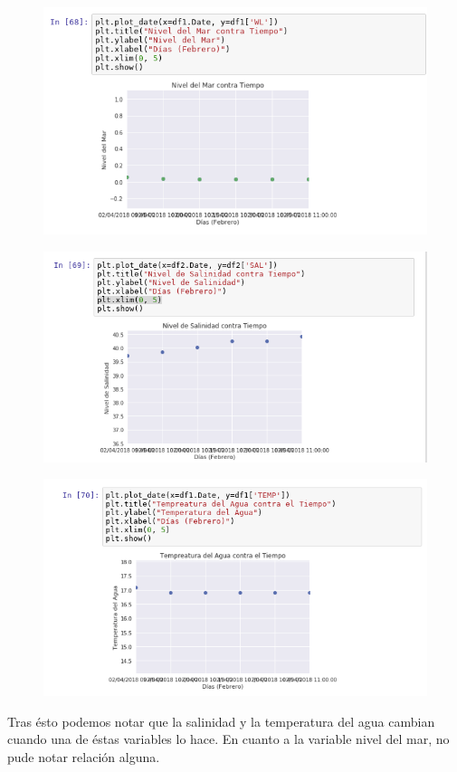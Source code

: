 \documentclass{article}
\begin{document}
\begin{figure}[H]
	\centering
    \includegraphics[width=\linewidth]{x1.png}\\
\end{figure}
\begin{figure}[H]
	\centering
    \includegraphics[width=\linewidth]{x2.png}\\
\end{figure}
\begin{figure}[H]
	\centering
    \includegraphics[width=\linewidth]{x3.png}\\
\end{figure}
Tras ésto podemos notar que la salinidad y la temperatura del agua cambian cuando una de éstas variables lo hace. En cuanto a la variable nivel del mar, no pude notar relación alguna.
\end{document}
